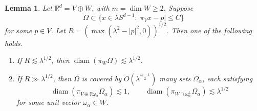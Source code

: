 \documentclass[10pt,a4paper]{amsart}
\newtheorem{lemma}{Lemma}
\newcommand{\R}{\mathbb R}
\newcommand{\la}{\lambda}
\newcommand{\ls}{\lesssim}
\begin{document}
	\begin{lemma}\label{lem:shell}
		Let \(\R^d=V\oplus W\), with \(m=\dim W\ge2\). Suppose
		\[
		\Omega\subset\{x\in\la S^{d-1}:|\pi_Vx-p|\le C\}
		\]
		for some \(p\in V\).  Let \(R=(\max(\la^2-|p|^2,0))^{1/2}\).
		Then one of the following holds.
		\begin{enumerate}
			\item[(i)] If \(R\ls\la^{1/2}\), then
			\(\operatorname{diam}(\pi_W\Omega)\ls\la^{1/2}\).
			\item[(ii)] If \(R\gg \la^{1/2}\), then \(\Omega\) is covered by
			\(O(\la^{\frac{m-1}2})\) many sets \(\Omega_\alpha\), each satisfying
			\[
			\operatorname{diam}(\pi_{V\oplus\R\omega_\alpha}\Omega_\alpha)\ls1,
			\qquad
			\operatorname{diam}(\pi_{W\cap\omega_\alpha^\perp}\Omega_\alpha)
			\ls\la^{1/2}
			\]
			for some unit vector \(\omega_\alpha\in W\).
		\end{enumerate}
	\end{lemma}
\end{document}
